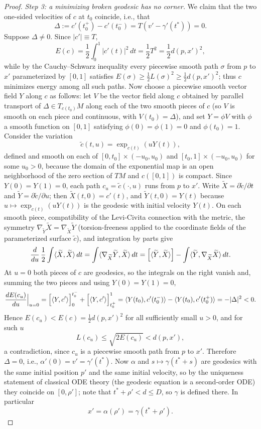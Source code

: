 \begin{proof}
\emph{Step 3: a minimizing broken geodesic has no corner.} We
claim that the two one-sided velocities of $c$ at $t_0$ coincide,
i.e., that
$$\Delta:=c'(t_0^+)-c'(t_0^-)=T\left(v'-\gamma'(t^*)\right)=0.$$
Suppose $\Delta\not=0$. Since $|c'|\equiv T$,
$$E(c)=\frac{1}{2}\int_0^1|c'(t)|^2\,dt=\frac{1}{2}T^2
=\frac{1}{2}d(p,x')^2,$$
while by the Cauchy--Schwarz inequality every piecewise smooth
path $\sigma$ from $p$ to $x'$ parameterized by $[0,1]$ satisfies
$E(\sigma)\ge\frac{1}{2}L(\sigma)^2\ge\frac{1}{2}d(p,x')^2$; thus
$c$ minimizes energy among all such paths. Now choose a piecewise
smooth vector field $Y$ along $c$ as follows: let $V$ be the
vector field along $c$ obtained by parallel transport of
$\Delta\in T_{c(t_0)}M$ along each of the two smooth pieces of $c$
(so $V$ is smooth on each piece and continuous, with
$V(t_0)=\Delta$), and set $Y=\phi V$ with $\phi$ a smooth function
on $[0,1]$ satisfying $\phi(0)=\phi(1)=0$ and $\phi(t_0)=1$.
Consider the variation
$$\tilde c(t,u)=\exp_{c(t)}(uY(t)),$$
defined and smooth on each of $[0,t_0]\times(-u_0,u_0)$ and
$[t_0,1]\times(-u_0,u_0)$ for some $u_0>0$, because the domain of
the exponential map is an open neighborhood of the zero section of
$TM$ and $c([0,1])$ is compact. Since $Y(0)=Y(1)=0$, each path
$c_u=\tilde c(\cdot,u)$ runs from $p$ to $x'$. Write $\widetilde
X=\partial\tilde c/\partial t$ and $\widetilde Y=\partial\tilde
c/\partial u$; then $\widetilde X(t,0)=c'(t)$, and $\widetilde
Y(t,0)=Y(t)$ because $u\mapsto\exp_{c(t)}(uY(t))$ is the geodesic
with initial velocity $Y(t)$. On each smooth piece, compatibility
of the Levi-Civita connection with the metric, the symmetry
$\nabla_{\widetilde Y}\widetilde X=\nabla_{\widetilde X}\widetilde
Y$ (torsion-freeness applied to the coordinate fields of the
parameterized surface $\tilde c$), and integration by parts give
$$\frac{d}{du}\,\frac{1}{2}\int\langle\widetilde X,\widetilde
X\rangle\,dt=\int\langle\nabla_{\widetilde X}\widetilde
Y,\widetilde X\rangle\,dt=\Bigl[\langle\widetilde Y,\widetilde
X\rangle\Bigr]-\int\langle\widetilde Y,\nabla_{\widetilde
X}\widetilde X\rangle\,dt.$$
At $u=0$ both pieces of $c$ are geodesics, so the integrals on the
right vanish and, summing the two pieces and using $Y(0)=Y(1)=0$,
$$\frac{dE(c_u)}{du}\Bigl|_{u=0}\Bigr.
=\Bigl[\langle Y,c'\rangle\Bigr]_0^{t_0^-}
+\Bigl[\langle Y,c'\rangle\Bigr]_{t_0^+}^{1}
=\langle Y(t_0),c'(t_0^-)\rangle-\langle Y(t_0),c'(t_0^+)\rangle
=-|\Delta|^2<0.$$
Hence $E(c_u)<E(c)=\frac{1}{2}d(p,x')^2$ for all sufficiently
small $u>0$, and for such $u$
$$L(c_u)\le\sqrt{2E(c_u)}<d(p,x'),$$
a contradiction, since $c_u$ is a piecewise smooth path from $p$
to $x'$. Therefore $\Delta=0$, i.e.,
$\alpha'(0)=v'=\gamma'(t^*)$. Now $\alpha$ and
$s\mapsto\gamma(t^*+s)$ are geodesics with the same initial
position $p'$ and the same initial velocity, so by the uniqueness
statement of classical ODE theory (the geodesic equation is a
second-order ODE) they coincide on $[0,\rho']$; note that
$t^*+\rho'<d\le D$, so $\gamma$ is defined there. In particular
$$x'=\alpha(\rho')=\gamma(t^*+\rho').$$


\end{proof}
